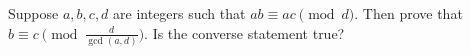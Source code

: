 Suppose $a,b,c,d$ are integers such that $ab \equiv ac \pmod{d}$. Then prove that $b \equiv c \pmod{\frac{d}{\gcd(a, d)}}$. Is the converse statement true?